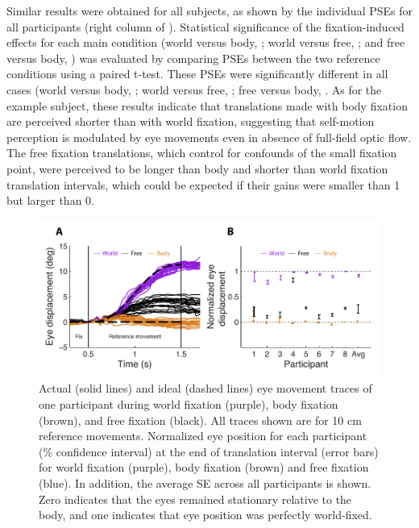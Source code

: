 Similar results were obtained for all subjects, as shown by the individual PSEs for all participants (right column of ). Statistical significance of the fixation-induced effects for each main condition (world versus body, ; world versus free, ; and free versus body, ) was evaluated by comparing PSEs between the two reference conditions using a paired t-test. These PSEs were significantly different in all cases (world versus body, ; world versus free, ; free versus body, . As for the example subject, these results indicate that translations made with body fixation are perceived shorter than with world fixation, suggesting that self-motion perception is modulated by eye movements even in absence of full-field optic flow. The free fixation translations, which control for confounds of the small fixation point, were perceived to be longer than body and shorter than world fixation translation intervals, which could be expected if their gains were smaller than 1 but larger than 0.

\begin{figure}
    \includegraphics[width=1.0\textwidth]{src/paper3/figure3.pdf}

    \caption{ Actual (solid lines) and ideal (dashed lines) eye movement traces of one participant during world fixation (purple), body fixation (brown), and free fixation (black). All traces shown are for 10 \si{\centi\metre} reference movements.  Normalized eye position for each participant (\% confidence interval) at the end of translation interval (error bars) for world fixation (purple), body fixation (brown) and free fixation (blue). In addition, the average {\textpm}SE across all participants is shown. Zero indicates that the eyes remained stationary relative to the body, and one indicates that eye position was perfectly world-fixed.}
    \label{p3:fig3}
\end{figure}

